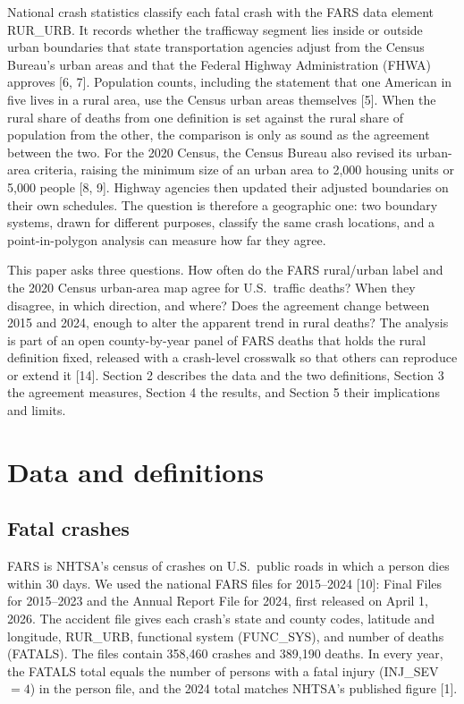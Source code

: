 \documentclass[12pt]{article}
\begin{document}
National crash statistics classify each fatal crash with the FARS data element RUR\_URB. It records whether the trafficway segment lies inside or outside urban boundaries that state transportation agencies adjust from the Census Bureau's urban areas and that the Federal Highway Administration (FHWA) approves [6, 7]. Population counts, including the statement that one American in five lives in a rural area, use the Census urban areas themselves [5]. When the rural share of deaths from one definition is set against the rural share of population from the other, the comparison is only as sound as the agreement between the two. For the 2020 Census, the Census Bureau also revised its urban-area criteria, raising the minimum size of an urban area to 2{,}000 housing units or 5{,}000 people [8, 9]. Highway agencies then updated their adjusted boundaries on their own schedules. The question is therefore a geographic one: two boundary systems, drawn for different purposes, classify the same crash locations, and a point-in-polygon analysis can measure how far they agree.

This paper asks three questions. How often do the FARS rural/urban label and the 2020 Census urban-area map agree for U.S.\ traffic deaths? When they disagree, in which direction, and where? Does the agreement change between 2015 and 2024, enough to alter the apparent trend in rural deaths? The analysis is part of an open county-by-year panel of FARS deaths that holds the rural definition fixed, released with a crash-level crosswalk so that others can reproduce or extend it [14]. Section 2 describes the data and the two definitions, Section 3 the agreement measures, Section 4 the results, and Section 5 their implications and limits.

\section{Data and definitions}

\subsection{Fatal crashes}

FARS is NHTSA's census of crashes on U.S.\ public roads in which a person dies within 30 days. We used the national FARS files for 2015--2024 [10]: Final Files for 2015--2023 and the Annual Report File for 2024, first released on April 1, 2026. The accident file gives each crash's state and county codes, latitude and longitude, RUR\_URB, functional system (FUNC\_SYS), and number of deaths (FATALS). The files contain 358{,}460 crashes and 389{,}190 deaths. In every year, the FATALS total equals the number of persons with a fatal injury (INJ\_SEV $=4$) in the person file, and the 2024 total matches NHTSA's published figure [1].
\end{document}
